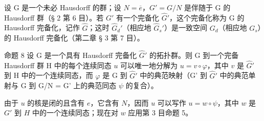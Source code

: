 设 G 是一个未必 Hausdorff 的群；设 \(N = \overline{e}\)，\(G' = G/N\) 是伴随于 G 的 Hausdorff 群（§ 2 第 6 目）。若 \(G'\) 有一个完备化 \(\hat{G}'\)，这个完备化称为 G 的 Hausdorff 完备化，记作 \(\hat{G}\)；这时 \(\hat{G}_{d}'\)（相应地 \(\hat{G}_{s}'\)）是一致空间 \(G_{d}\)（相应地 \(G_{s}\)）的 Hausdorff 完备化（第二章 § 3 第 7 目）。

命题 8 设 G 是一个具有 Hausdorff 完备化 \(\hat{G}'\) 的拓扑群。则 G 到一个完备 Hausdorff 群 H 中的每个连续同态 \(u\) 可以唯一地分解为 \(u = v \circ \varphi\)，其中 \(v\) 是 \(\hat{G}'\) 到 H 中的一个连续同态，而 \(\varphi\) 是 G 到 \(\hat{G}'\) 中的典范映射（G' 到 \(\hat{G}'\) 中的典范单射与 G 到 G/N = G' 上的典范同态 \(\psi\) 的复合）。

由于 \(u\) 的核是闭的且含有 \(e\)，它含有 \(N\)，因而 \(u\) 可以写作 \(u = w \circ \psi\)，其中 \(w\) 是 \(G'\) 到 \(H\) 中的一个连续同态；现在对 \(w\) 应用第 3 目命题 5。

